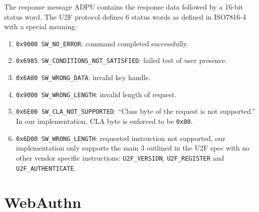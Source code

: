 \documentclass[acmtog,review]{acmart}
\begin{document}
The response message ADPU contains the response data followed by a 16-bit status word.
The U2F protocol defines 6 status words as defined in ISO7816-4 with a special meaning:
\begin{enumerate}
    \item \texttt{0x9000 SW\_NO\_ERROR}: command completed successfully.
    \item \texttt{0x6985 SW\_CONDITIONS\_NOT\_SATISFIED}: failed test of user presence.
    \item \texttt{0x6A80 SW\_WRONG\_DATA}: invalid key handle.
    \item \texttt{0x9000 SW\_WRONG\_LENGTH}: invalid length of request.
    \item \texttt{0x6E00 SW\_CLA\_NOT\_SUPPORTED}: ``Class byte of the request is not supported.'' In our implementation, CLA byte is enforced to be \texttt{0x00}.
    \item \texttt{0x6D00 SW\_WRONG\_LENGTH}: requested instruction not supported, our implementation only supports the main 3 outlined in the U2F spec with no other vendor specific instructions: \texttt{U2F\_VERSION}, \texttt{U2F\_REGISTER} and \texttt{U2F\_AUTHENTICATE}.
\end{enumerate}





\section{WebAuthn}


\end{document}
